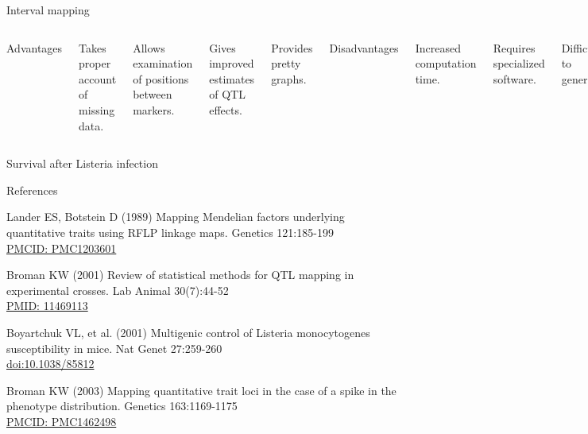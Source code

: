 \documentclass[aspectratio=169,12pt,t]{beamer}
\begin{document}
\begin{frame}{Interval mapping}

\begin{columns}


{\hilit Advantages}

\bi
\item Takes proper account of missing data.
\item Allows examination of positions between markers.
\item Gives improved estimates of QTL effects.
\item Provides pretty graphs.
\ei



{\hilit Disadvantages}

\bi
\item Increased computation time.
\item Requires specialized software.
\item Difficult to generalize.
\item {\vhilit Only considers one QTL at a time.}
\ei


\end{columns}

\end{frame}




\begin{frame}[c]{Survival after Listeria infection}
\end{frame}


\begin{frame}{References}
\vspace{-7mm}

  \bbi

\item Lander ES, Botstein D (1989) Mapping Mendelian factors
  underlying quantitative traits using RFLP linkage maps. Genetics
  121:185-199 \\
  \href{https://www.ncbi.nlm.nih.gov/pmc/articles/PMC1203601}{\footnotesize
    PMCID: PMC1203601}

\item Broman KW (2001) Review of statistical methods for QTL mapping
  in experimental crosses. Lab Animal 30(7):44-52 \\
  \href{https://www.ncbi.nlm.nih.gov/pubmed/11469113}{\footnotesize
    PMID: 11469113}

\item Boyartchuk VL, et al. (2001) Multigenic control of Listeria monocytogenes
  susceptibility in mice. Nat Genet 27:259-260 \\
  \href{https://doi.org/10.1038/85812}{\footnotesize doi:10.1038/85812}

\item Broman KW (2003) Mapping quantitative trait loci in the case
  of a spike in the phenotype distribution. Genetics 163:1169-1175 \\
  \href{https://www.ncbi.nlm.nih.gov/pmc/articles/PMC1462498}{\footnotesize
    PMCID: PMC1462498}

\ei


\end{frame}
\end{document}
